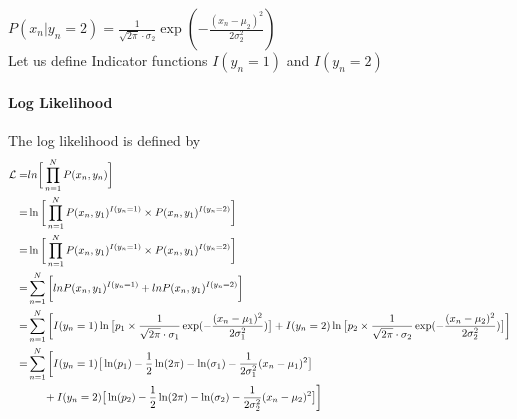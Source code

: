 \documentclass[letterpaper,doc,notimes]{apa6}
\begin{document}
{$P(x_n | y_n=2) = \frac{1}{\sqrt{2\pi } \cdot \sigma_2} \exp(-\frac{(x_n-\mu_2)^2}{2\sigma_2^2})$ \\

Let us define Indicator functions $I(y_n=1)$ and $I(y_n=2)$


\paragraph{Log Likelihood}
The log likelihood is defined by
\begin{align*}
\mathcal{L} = & ln \bigg[ \prod_{n=1}^{N} P(x_n, y_n) \bigg] \\
	= &  \ln \bigg[ \prod_{n=1}^{N} P(x_n, y_1)^{I(y_n=1)} \times P(x_n, y_1)^{I(y_n=2)} \bigg] \\
	= & \ln \bigg[ \prod_{n=1}^{N} P(x_n, y_1)^{I(y_n=1)} \times P(x_n, y_1)^{I(y_n=2)} \bigg] \\
	= &  \sum_{n=1}^{N}\bigg[ ln P(x_n, y_1)^{I(y_n=1)} + ln P(x_n, y_1)^{I(y_n=2)} \bigg] \\
	= &  \sum_{n=1}^{N}\bigg[ I(y_n=1) \ln \big[ p_1 \times \frac{1}{\sqrt{2\pi } \cdot \sigma_1} \exp(-\frac{(x_n-\mu_1)^2}{2\sigma_1^2}) \big] 
			 + I(y_n=2) \ln \big[ p_2 \times \frac{1}{\sqrt{2\pi } \cdot \sigma_2} \exp(-\frac{(x_n-\mu_2)^2}{2\sigma_2^2}) \big] \bigg]  \\
	= & \sum_{n=1}^{N}\bigg[
		I(y_n=1)\big[ \ln(p_1) -\frac{1}{2}\ln(2\pi) - \ln(\sigma_1) - \frac{1}{2\sigma_1^2} (x_n-\mu_1)^2 \big] \\
		 & \indent  + 
		I(y_n=2)\big[ \ln(p_2) -\frac{1}{2}\ln(2\pi) - \ln(\sigma_2) - \frac{1}{2\sigma_2^2} (x_n-\mu_2)^2 \big] \bigg] \\
\end{align*}

}
\end{document}
